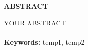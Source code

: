\chapter*{}
\vspace*{-1.0cm}
\begin{center}
\normalfont\LARGE\textbf{ABSTRACT}
\end{center}
YOUR ABSTRACT.\\\\
\textbf{Keywords:} temp1, temp2